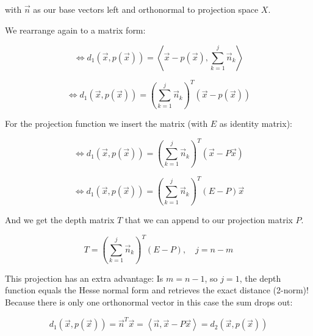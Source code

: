 \documentclass{article}
\newcommand{\lrangle}[1]{\left\langle #1 \right\rangle}
\begin{document}
with \(\vec{n}\) as our base vectors left and orthonormal to projection space \(X\).

We rearrange again to a matrix form:

	\begin{equation}
		\iff d_1(\vec{x}, p(\vec{x})) = \lrangle{ \vec{x} - p(\vec{x}), \sum_{k=1}^{j}{\vec{n}_k} }
	\end{equation}

	\begin{equation}
		\iff d_1(\vec{x}, p(\vec{x})) = (\sum_{k=1}^{j}{\vec{n}_k})^T (\vec{x} - p(\vec{x}))
	\end{equation}

For the projection function we insert the matrix (with \(E\) as identity matrix):

	\begin{equation}
		\iff d_1(\vec{x}, p(\vec{x})) = (\sum_{k=1}^{j}{\vec{n}_k})^T (\vec{x} - P\vec{x})
	\end{equation}

	\begin{equation}
		\iff d_1(\vec{x}, p(\vec{x})) = (\sum_{k=1}^{j}{\vec{n}_k})^T (E - P) \vec{x}
	\end{equation}

And we get the depth matrix \(T\) that we can append to our projection matrix \(P\).

	\begin{equation}
		T = (\sum_{k=1}^{j}{\vec{n}_k})^T (E-P), \quad j = n - m
	\end{equation}

This projection has an extra advantage: Is \(m = n - 1\), so \(j = 1\), the depth function equals
the Hesse normal form and retrieves the exact distance (2-norm)!
Because there is only one orthonormal vector in this case the sum drops out:

	\begin{equation}
		d_1(\vec{x}, p(\vec{x})) = \vec{n}^T \vec{x} = \lrangle{ \vec{n}, \vec{x} - P\vec{x}} =
		d_2(\vec{x}, p(\vec{x}))
	\end{equation}
\end{document}
